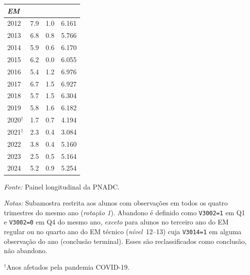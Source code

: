 \begin{table}[htbp]
\begin{threeparttable}
\begin{tabular}{lrrr}
\\[0.3em]
\multicolumn{4}{l}{\textit{EM}} \\
\midrule
2012 & 7.9 & 1.0 & 6.161 \\
2013 & 6.8 & 0.8 & 5.766 \\
2014 & 5.9 & 0.6 & 6.170 \\
2015 & 6.2 & 0.0 & 6.055 \\
2016 & 5.4 & 1.2 & 6.976 \\
2017 & 6.7 & 1.5 & 6.927 \\
2018 & 5.7 & 1.5 & 6.304 \\
2019 & 5.8 & 1.6 & 6.182 \\
2020$^{\dagger}$ & 1.7 & 0.7 & 4.194 \\
2021$^{\dagger}$ & 2.3 & 0.4 & 3.084 \\
2022 & 3.8 & 0.4 & 5.160 \\
2023 & 2.5 & 0.5 & 5.164 \\
2024 & 5.2 & 0.9 & 5.254 \\
\bottomrule
\end{tabular}
\begin{tablenotes}\footnotesize
\item \textit{Fonte:} Painel longitudinal da PNADC.
\item \textit{Notas:} Subamostra restrita aos alunos com observa\c{c}\~oes em todos os quatro trimestres do mesmo ano (\emph{rota\c{c}\~ao 1}). Abandono \'e definido como \texttt{V3002=1} em Q1 e \texttt{V3002=0} em Q4 do mesmo ano, \emph{exceto} para alunos no terceiro ano do EM regular ou no quarto ano do EM t\'ecnico (\emph{n\'ivel}~12--13) cuja \texttt{V3014=1} em alguma observa\c{c}\~ao do ano (conclus\~ao terminal). Esses s\~ao reclassificados como conclus\~ao, n\~ao abandono.
\item $^{\dagger}$Anos afetados pela pandemia COVID-19.
\end{tablenotes}
\end{threeparttable}
\end{table}
